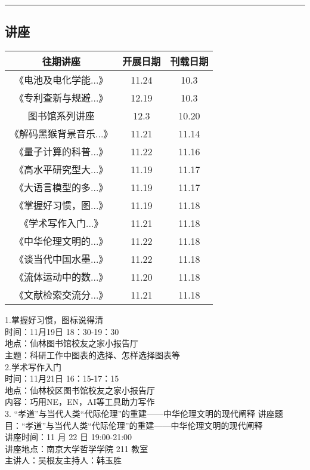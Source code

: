 \documentclass[letterpaper, 12pt]{article}
\begin{document}
\hrule
\pagebreak
\begin{multicols}{2}

\section{讲座}
\begin{tabular}{|c|c|c|}
    \hline
    往期讲座 & 开展日期 & 刊载日期\\
    \hline\hline
    《电池及电化学能...》 & 11.24 & 10.3\\
    《专利查新与规避...》 & 12.19 & 10.3\\
    图书馆系列讲座 & 12.3 & 10.20\\
    《解码黑猴背景音乐...》 & 11.21 & 11.14\\
    《量子计算的科普...》 & 11.22 & 11.16\\
    《高水平研究型大...》 & 11.19 & 11.17\\
    《大语言模型的多...》 & 11.19 & 11.17\\
    《掌握好习惯，图...》 & 11.19 & 11.18\\
    《学术写作入门...》& 11.21 & 11.18\\
    《中华伦理文明的...》& 11.22 & 11.18\\
    《谈当代中国水墨...》& 11.22 & 11.18\\
    《流体运动中的数...》 &11.20 & 11.18\\
    《文献检索交流分...》 & 11.21 & 11.18\\
    \hline
\end{tabular}

1.掌握好习惯，图标说得清\\
时间：11月19日 18：30-19：30\\
地点：仙林图书馆校友之家小报告厅\\
主题：科研工作中图表的选择、怎样选择图表等\\

2.学术写作入门\\
时间：11月21日 16：15-17：15\\
地点：仙林校区图书馆校友之家小报告厅\\
内容：巧用NE，EN，AI等工具助力写作\\

3. “孝道”与当代人类“代际伦理”的重建——中华伦理文明的现代阐释
讲座题目：“孝道”与当代人类“代际伦理”的重建——中华伦理文明的现代阐释\\
讲座时间：11 月 22 日 19:00-21:00\\
讲座地点：南京大学哲学学院 211 教室\\
主讲人：吴根友主持人：韩玉胜


\end{multicols}
\end{document}

